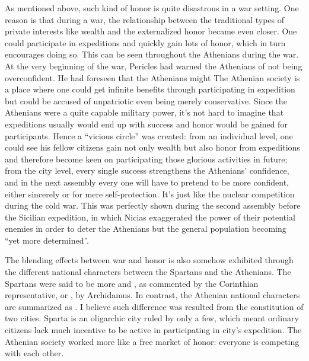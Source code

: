 As mentioned above, such kind of honor is quite disastrous in a war setting. One
reason is that during a war, the relationship between the traditional types of
private interests like wealth and the externalized honor became even closer.
One could participate in expeditions and quickly gain lots of honor, which in
turn encourages doing so. This can be seen throughout the Athenians during the
war. At the very beginning of the war, Pericles had warned the
Athenians of not being overconfident. He had foreseen that the Athenians might
 The Athenian society is a place where one
could get infinite benefits through participating in expedition but could be
accused of unpatriotic even being merely conservative. Since the Athenians were
a quite capable military power, it’s not hard to imagine that expeditions
usually would end up with success and honor would be gained for participants.
Hence a “vicious circle” was created: from an individual level, one could see
his fellow citizens gain not only wealth but also honor from expeditions and
therefore become keen on participating those glorious activities in future; from
the city level, every single success strengthens the Athenians’ confidence, and
in the next assembly every one will have to pretend to be more confident, either
sincerely or for mere self-protection. It’s just like the nuclear competition
during the cold war. This was perfectly shown during the second assembly
 before the Sicilian expedition, in which Nicias exaggerated the
power of their potential enemies in order to deter the Athenians but the general
population becoming “yet more determined”.

The blending effects between war and honor is also somehow exhibited through the
different national characters between the Spartans and the Athenians. The
Spartans were said to be more  and , as
commented by the Corinthian representative, or ,
by Archidamus. In contrast, the Athenian national characters are
summarized as . I believe such
difference was resulted from the constitution of two cities. Sparta is an
oligarchic city ruled by only a few, which meant ordinary citizens lack much
incentive to be active in participating in city’s expedition. The Athenian
society worked more like a free market of honor: everyone is competing with each
other.

